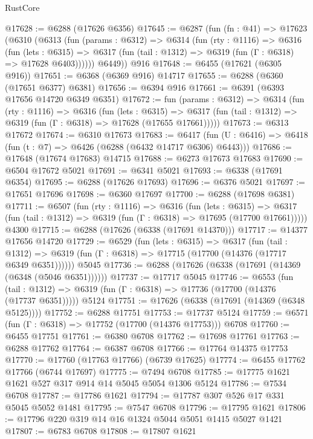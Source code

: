 \begin{lexlean}{RustCore}
\begin{coremodule}
@17628 := @6288 (@17626 @6356)
@17645 := @6287
    (fun (fn : @41) =>
    @17623
      (@6310
        (@6313
          (fun (params : @6312) =>
          @6314
            (fun (rty : @1116) =>
            @6316
              (fun (lets : @6315) =>
              @6317 (fun (tail : @1312) => @6319 (fun (Γ : @6318) => @17628 @6403))))))
        @6449))
    @916
@17648 := @6455 (@17621 (@6305 @916))
@17651 := @6368 (@6369 @916) @14717
@17655 := @6288 (@6360 (@17651 @6377) @6381)
@17656 := @6394 @916
@17661 := @6391 (@6393 @17656 @14720 @6349 @6351)
@17672 := fun (params : @6312) =>
  @6314
    (fun (rty : @1116) =>
    @6316
      (fun (lets : @6315) =>
      @6317 (fun (tail : @1312) => @6319 (fun (Γ : @6318) => @17628 (@17655 @17661)))))
@17673 := @6313 @17672
@17674 := @6310 @17673
@17683 := @6417
    (fun (U : @6416) => @6418 (fun (t : @7) => @6426 (@6288 (@6432 @14717 @6306) @6443)))
@17686 := @17648 (@17674 @17683) @14715
@17688 := @6273 @17673 @17683
@17690 := @6504 @17672 @5021
@17691 := @6341 @5021
@17693 := @6338 (@17691 @6354)
@17695 := @6288 (@17626 @17693)
@17696 := @6376 @5021
@17697 := @17651 @17696
@17698 := @6360 @17697
@17700 := @6288 (@17698 @6381)
@17711 := @6507
    (fun (rty : @1116) =>
    @6316
      (fun (lets : @6315) =>
      @6317 (fun (tail : @1312) => @6319 (fun (Γ : @6318) => @17695 (@17700 @17661)))))
    @4300
@17715 := @6288 (@17626 (@6338 (@17691 @14370)))
@17717 := @14377 @17656 @14720
@17729 := @6529
    (fun (lets : @6315) =>
    @6317
      (fun (tail : @1312) =>
      @6319 (fun (Γ : @6318) => @17715 (@17700 (@14376 (@17717 @6349 @6351))))))
    @5045
@17736 := @6288 (@17626 (@6338 (@17691 (@14369 (@6348 (@5046 @6351))))))
@17737 := @17717 @5045
@17746 := @6553
    (fun (tail : @1312) => @6319 (fun (Γ : @6318) => @17736 (@17700 (@14376 (@17737 @6351)))))
    @5124
@17751 := @17626 (@6338 (@17691 (@14369 (@6348 @5125))))
@17752 := @6288 @17751
@17753 := @17737 @5124
@17759 := @6571 (fun (Γ : @6318) => @17752 (@17700 (@14376 @17753))) @6708
@17760 := @6455 @17751
@17761 := @6380 @6708
@17762 := @17698 @17761
@17763 := @6288 @17762
@17764 := @6387 @6708
@17766 := @17764 @14375 @17753
@17770 := @17760 (@17763 @17766) (@6739 @17625)
@17774 := @6455 @17762 @17766 (@6744 @17697)
@17775 := @7494 @6708
@17785 := @17775 @1621 @1621 @527 @317 @914 @14 @5045 @5054 @1306 @5124
@17786 := @7534 @6708
@17787 := @17786 @1621
@17794 := @17787 @307 @526 @17 @331 @5045 @5052 @1481
@17795 := @7547 @6708
@17796 := @17795 @1621
@17806 := @17796 @220 @319 @14 @16 @1324 @5044 @5051 @1415 @5027 @1421
@17807 := @6783 @6708
@17808 := @17807 @1621

\end{coremodule}
\end{lexlean}

